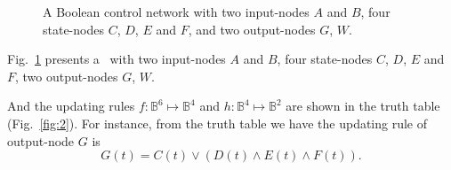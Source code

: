 \begin{example}
	 \begin{figure}[thpb]
		\centering
		
		\caption{A Boolean control network with two input-nodes $A$ and $B$, four state-nodes $C$, $D$, $E$ and $F$, and two output-nodes $G$, $W$. }%
		\label{fig:1}
	\end{figure}
	
Fig.~\ref{fig:1} presents a \BCN\ with two input-nodes $A$ and $B$, four state-nodes $C$, $D$, $E$ and $F$, two output-nodes $G$, $W$. 

And the updating rules $f:\mathbb{B}^{6}\mapsto \mathbb{B}^4$ and $h:\mathbb{B}^4\mapsto \mathbb{B}^2$ are shown in the truth table (Fig.~\ref{fig:2}).  
For instance, from the truth table we have the updating rule of output-node $G$ is 
\[G(t)=C(t)\vee {({D}(t)\wedge { E}(t)\wedge {F}(t))}.\]
  
   \label{exa:2}
\end{example}   

